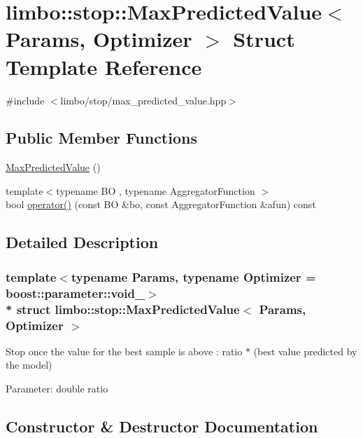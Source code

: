 \hypertarget{structlimbo_1_1stop_1_1_max_predicted_value}{}\section{limbo\+:\+:stop\+:\+:Max\+Predicted\+Value$<$ Params, Optimizer $>$ Struct Template Reference}
\label{structlimbo_1_1stop_1_1_max_predicted_value}


{\ttfamily \#include $<$limbo/stop/max\+\_\+predicted\+\_\+value.\+hpp$>$}

\subsection*{Public Member Functions}
\begin{DoxyCompactItemize}
\item 
\hyperlink{structlimbo_1_1stop_1_1_max_predicted_value_a211e3d4d8935c84ddb27e09d76a1726a}{Max\+Predicted\+Value} ()
\item 
{\footnotesize template$<$typename BO , typename Aggregator\+Function $>$ }\\bool \hyperlink{structlimbo_1_1stop_1_1_max_predicted_value_a7f5cb07d4a9b666e4c1cac91afa3fca0}{operator()} (const BO \&bo, const Aggregator\+Function \&afun) const 
\end{DoxyCompactItemize}


\subsection{Detailed Description}
\subsubsection*{template$<$typename Params, typename Optimizer = boost\+::parameter\+::void\+\_\+$>$\\*
struct limbo\+::stop\+::\+Max\+Predicted\+Value$<$ Params, Optimizer $>$}

Stop once the value for the best sample is above \+: ratio $\ast$ (best value predicted by the model)

Parameter\+: double ratio 

\subsection{Constructor \& Destructor Documentation}

